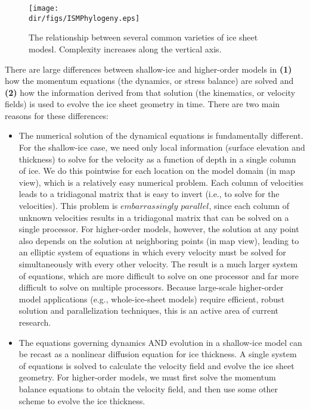 \begin{figure}
  \begin{center}
    \texttt{[image: \\dir/figs/ISMPhylogeny.eps]}
   \end{center}
  \caption{The relationship between several common varieties of ice sheet modesl. Complexity increases along the vertical axis.}
   \label{fig:phylogeny}
\end{figure} 

There are large differences between shallow-ice and higher-order models in 
\textbf{(1)} how the momentum equations (the dynamics, or stress balance) are solved and 
\textbf{(2)} how the information derived from that solution (the kinematics, or velocity fields) is used to evolve the ice sheet geometry in time. There are two main reasons for these differences:

\begin{itemize}
\item  The numerical solution of the dynamical equations is fundamentally different. For the shallow-ice case, we need only local information (surface elevation and thickness) to solve for the velocity as a function of depth in a single column of ice. We do this pointwise for each location on the model domain (in map view), which is a relatively easy numerical problem.  Each column of velocities leads to a tridiagonal matrix that is easy to invert (i.e., to solve for the velocities). This problem is $embarrassingly$ $parallel$, since each column of unknown velocities results in a tridiagonal matrix that can be solved on a single processor. For higher-order models, however, the solution at any point also depends on the solution at neighboring points (in map view),
leading to an elliptic system of equations in which every velocity must be solved for simultaneously with every other velocity. The result is a much larger system of equations, which are more difficult to solve on one processor and far more difficult to solve on multiple processors. Because large-scale higher-order model applications (e.g., whole-ice-sheet models) require efficient, robust solution and parallelization techniques, this is an active area of current research.  
\end{itemize}

\begin{itemize}
\item  The equations governing dynamics AND evolution in a shallow-ice model can be recast as a nonlinear diffusion equation for ice thickness. A single system of equations is solved to calculate the velocity field and evolve the ice sheet geometry. For higher-order models, we must first solve the momentum balance equations to obtain the velocity field, and then use some other scheme to evolve the ice thickness. 
\end{itemize}

